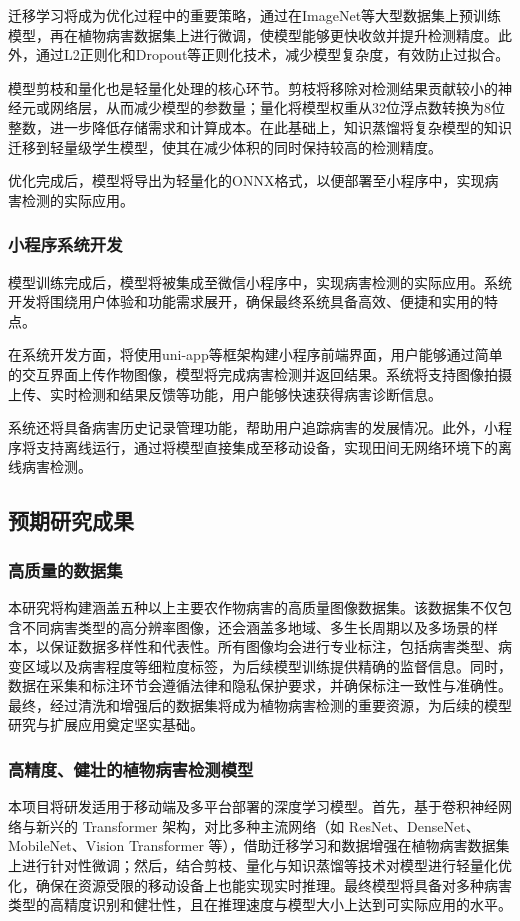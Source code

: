 迁移学习将成为优化过程中的重要策略，通过在ImageNet等大型数据集上预训练模型，再在植物病害数据集上进行微调，使模型能够更快收敛并提升检测精度。此外，通过L2正则化和Dropout等正则化技术，减少模型复杂度，有效防止过拟合。

模型剪枝和量化也是轻量化处理的核心环节。剪枝将移除对检测结果贡献较小的神经元或网络层，从而减少模型的参数量；量化将模型权重从32位浮点数转换为8位整数，进一步降低存储需求和计算成本。在此基础上，知识蒸馏将复杂模型的知识迁移到轻量级学生模型，使其在减少体积的同时保持较高的检测精度。

优化完成后，模型将导出为轻量化的ONNX格式，以便部署至小程序中，实现病害检测的实际应用。

\subsubsection{小程序系统开发}
模型训练完成后，模型将被集成至微信小程序中，实现病害检测的实际应用。系统开发将围绕用户体验和功能需求展开，确保最终系统具备高效、便捷和实用的特点。

在系统开发方面，将使用uni-app等框架构建小程序前端界面，用户能够通过简单的交互界面上传作物图像，模型将完成病害检测并返回结果。系统将支持图像拍摄上传、实时检测和结果反馈等功能，用户能够快速获得病害诊断信息。

系统还将具备病害历史记录管理功能，帮助用户追踪病害的发展情况。此外，小程序将支持离线运行，通过将模型直接集成至移动设备，实现田间无网络环境下的离线病害检测。

\subsection{预期研究成果}
\subsubsection{高质量的数据集}
本研究将构建涵盖五种以上主要农作物病害的高质量图像数据集。该数据集不仅包含不同病害类型的高分辨率图像，还会涵盖多地域、多生长周期以及多场景的样本，以保证数据多样性和代表性。所有图像均会进行专业标注，包括病害类型、病变区域以及病害程度等细粒度标签，为后续模型训练提供精确的监督信息。同时，数据在采集和标注环节会遵循法律和隐私保护要求，并确保标注一致性与准确性。最终，经过清洗和增强后的数据集将成为植物病害检测的重要资源，为后续的模型研究与扩展应用奠定坚实基础。
\subsubsection{高精度、健壮的植物病害检测模型}
本项目将研发适用于移动端及多平台部署的深度学习模型。首先，基于卷积神经网络与新兴的 Transformer 架构，对比多种主流网络（如 ResNet、DenseNet、MobileNet、Vision Transformer 等），借助迁移学习和数据增强在植物病害数据集上进行针对性微调；然后，结合剪枝、量化与知识蒸馏等技术对模型进行轻量化优化，确保在资源受限的移动设备上也能实现实时推理。最终模型将具备对多种病害类型的高精度识别和健壮性，且在推理速度与模型大小上达到可实际应用的水平。

